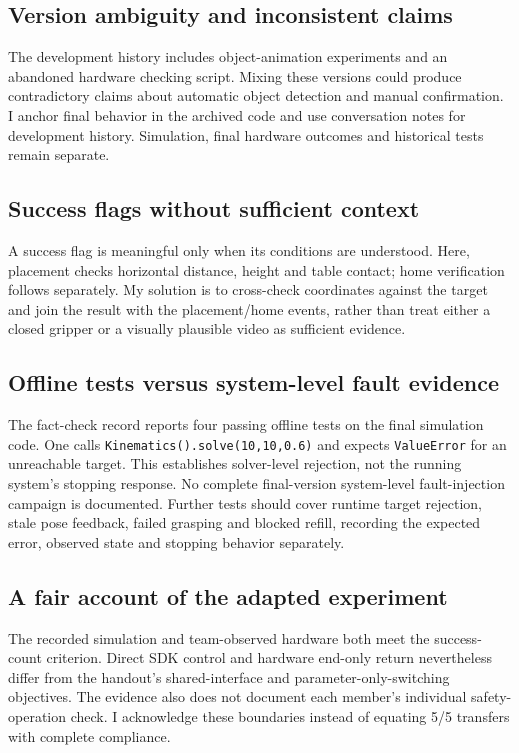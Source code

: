 \documentclass[11pt,a4paper]{article}
\newcommand{\code}[1]{{\small\nolinkurl{#1}}}
\begin{document}
\subsection{Version ambiguity and inconsistent claims}
The development history includes object-animation experiments and an abandoned
hardware checking script. Mixing these versions could produce contradictory
claims about automatic object detection and manual confirmation. I anchor final
behavior in the archived code and use conversation notes for development history.
Simulation, final hardware outcomes and historical tests remain separate.

\subsection{Success flags without sufficient context}
A success flag is meaningful only when its conditions are understood. Here,
placement checks horizontal distance, height and table contact; home verification
follows separately. My solution is to cross-check coordinates against the target
and join the result with the placement/home events, rather than treat either a
closed gripper or a visually plausible video as sufficient evidence.

\subsection{Offline tests versus system-level fault evidence}
The fact-check record reports four passing offline tests on the final simulation
code. One calls \code{Kinematics().solve(10,10,0.6)} and expects
\code{ValueError} for an unreachable target. This establishes solver-level
rejection, not the running system's stopping response. No complete final-version
system-level fault-injection campaign is documented. Further tests should cover
runtime target rejection, stale pose feedback, failed grasping and blocked refill,
recording the expected error, observed state and stopping behavior separately.

\subsection{A fair account of the adapted experiment}
The recorded simulation and team-observed hardware both meet the success-count
criterion. Direct SDK control and hardware end-only return nevertheless differ
from the handout's shared-interface and parameter-only-switching objectives.
The evidence also does not document each member's individual safety-operation
check. I acknowledge these boundaries instead of equating 5/5 transfers with
complete compliance.
\end{document}
